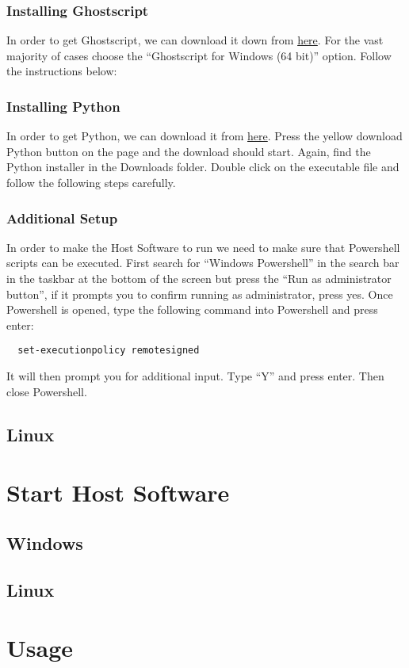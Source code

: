 \documentclass[12pt]{article}
\begin{document}
\subsubsection{Installing Ghostscript}
In order to get Ghostscript, we can download it down from \href{https://www.ghostscript.com/releases/gsdnld.html}{here}. For the vast majority of cases choose the ``Ghostscript for Windows (64 bit)'' option. Follow the instructions below:
\subsubsection{Installing Python}
In order to get Python, we can download it from \href{https://www.python.org/downloads/}{here}. Press the yellow download Python button on the page and the download should start. Again, find the Python installer in the Downloads folder. Double click on the executable file and follow the following steps carefully.
\subsubsection{Additional Setup}
In order to make the Host Software to run we need to make sure that Powershell scripts can be executed. First search for ``Windows Powershell'' in the search bar in the taskbar at the bottom of the screen but press the ``Run as administrator button'', if it prompts you to confirm running as administrator, press yes. Once Powershell is opened, type the following command into Powershell and press enter:
\begin{verbatim}
  set-executionpolicy remotesigned
\end{verbatim}
It will then prompt you for additional input. Type ``Y'' and press enter. Then close Powershell.
\subsection{Linux}
\section{Start Host Software}
\subsection{Windows}
\subsection{Linux}
\section{Usage}
\end{document}
